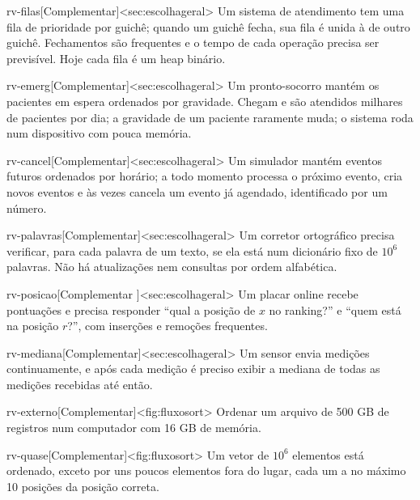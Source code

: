 \begin{exercicio}{rv-filas}[Complementar]<sec:escolhageral>
Um sistema de atendimento tem uma fila de prioridade por guichê; quando um guichê fecha, sua fila é unida à de outro guichê. Fechamentos são frequentes e o tempo de cada operação precisa ser previsível. Hoje cada fila é um heap binário.
\end{exercicio}
\begin{exercicio}{rv-emerg}[Complementar]<sec:escolhageral>
Um pronto-socorro mantém os pacientes em espera ordenados por gravidade. Chegam e são atendidos milhares de pacientes por dia; a gravidade de um paciente raramente muda; o sistema roda num dispositivo com pouca memória.
\end{exercicio}
\begin{exercicio}{rv-cancel}[Complementar]<sec:escolhageral>
Um simulador mantém eventos futuros ordenados por horário; a todo momento processa o próximo evento, cria novos eventos e às vezes cancela um evento já agendado, identificado por um número.
\end{exercicio}
\begin{exercicio}{rv-palavras}[Complementar]<sec:escolhageral>
Um corretor ortográfico precisa verificar, para cada palavra de um texto, se ela está num dicionário fixo de $10^6$ palavras. Não há atualizações nem consultas por ordem alfabética.
\end{exercicio}
\begin{exercicio}{rv-posicao}[Complementar \estrela]<sec:escolhageral>
Um placar online recebe pontuações e precisa responder ``qual a posição de $x$ no ranking?'' e ``quem está na posição $r$?'', com inserções e remoções frequentes.
\end{exercicio}
\begin{exercicio}{rv-mediana}[Complementar]<sec:escolhageral>
Um sensor envia medições continuamente, e após cada medição é preciso exibir a mediana de todas as medições recebidas até então.
\end{exercicio}
\begin{exercicio}{rv-externo}[Complementar]<fig:fluxosort>
Ordenar um arquivo de 500 GB de registros num computador com 16 GB de memória.
\end{exercicio}
\begin{exercicio}{rv-quase}[Complementar]<fig:fluxosort>
Um vetor de $10^6$ elementos está ordenado, exceto por uns poucos elementos fora do lugar, cada um a no máximo 10 posições da posição correta.
\end{exercicio}
